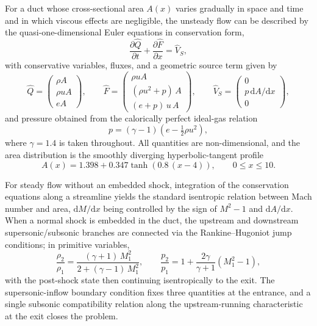 For a duct whose cross-sectional area \(A(x)\) varies gradually in space and time and in which viscous effects are negligible, the unsteady flow can be described by the quasi-one-dimensional Euler equations in conservation form,
\begin{equation}
    \frac{\partial \hat Q}{\partial t} + \frac{\partial \hat F}{\partial x} = \hat V_S,
\end{equation}
with conservative variables, fluxes, and a geometric source term given by
\begin{equation}
    \hat Q = \begin{pmatrix} \rho A \\ \rho u A \\ e A \end{pmatrix}, \qquad
    \hat F = \begin{pmatrix} \rho u A \\ (\rho u^2 + p)\, A \\ (e + p)\, u\, A \end{pmatrix}, \qquad
    \hat V_S = \begin{pmatrix} 0 \\ p \, \mathrm{d}A/\mathrm{d}x \\ 0 \end{pmatrix},
\end{equation}
and pressure obtained from the calorically perfect ideal-gas relation
\begin{equation}
    p = (\gamma - 1)\!\left(e - \tfrac{1}{2}\rho u^{2}\right),
\end{equation}
where \(\gamma = 1.4\) is taken throughout. All quantities are non-dimensional, and the area distribution is the smoothly diverging hyperbolic-tangent profile
\begin{equation}
    A(x) = 1.398 + 0.347 \tanh\!\left(0.8\,(x - 4)\right), \qquad 0 \leq x \leq 10. \label{eq:area}
\end{equation}

For steady flow without an embedded shock, integration of the conservation equations along a streamline yields the standard isentropic relation between Mach number and area, \(\mathrm{d}M/\mathrm{d}x\) being controlled by the sign of \(M^{2}-1\) and \(\mathrm{d}A/\mathrm{d}x\). When a normal shock is embedded in the duct, the upstream and downstream supersonic/subsonic branches are connected via the Rankine--Hugoniot jump conditions; in primitive variables,
\begin{equation}
    \frac{\rho_{2}}{\rho_{1}} = \frac{(\gamma+1)\, M_{1}^{2}}{2 + (\gamma-1)\, M_{1}^{2}}, \qquad
    \frac{p_{2}}{p_{1}} = 1 + \frac{2\gamma}{\gamma+1}\!\left(M_{1}^{2}-1\right),
\end{equation}
with the post-shock state then continuing isentropically to the exit. The supersonic-inflow boundary condition fixes three quantities at the entrance, and a single subsonic compatibility relation along the upstream-running characteristic at the exit closes the problem.

